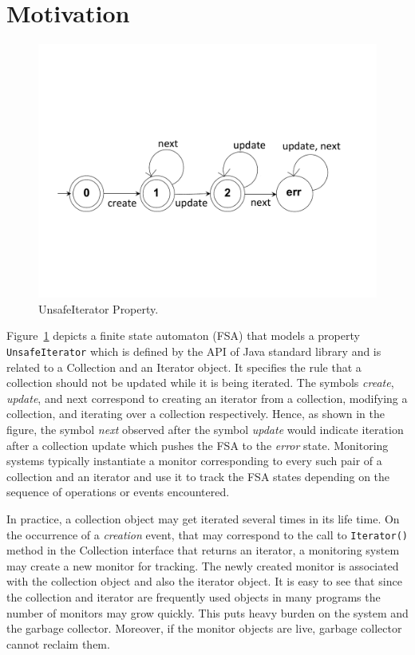 \section{Motivation}
\label{sec:motivation}

\begin{figure}[t]
\centering
  \includegraphics[scale=0.3, trim=0 5cm 0 6cm]{./images/unsafeiterator.pdf}
  \caption[UnsafeIterator Property FSA]{UnsafeIterator Property.}
  \label{fig:unsafeiteratorfsa}
\end{figure}

Figure~\ref{fig:unsafeiteratorfsa} depicts a finite state automaton (FSA) that models a property \texttt{UnsafeIterator} which is defined by the API of Java standard library and is related to a \textsf{Collection} and an \textsf{Iterator} object. It specifies the rule that a collection should not be updated while it is being iterated. The symbols \textit{create}, \textit{update}, and {next} correspond to creating an iterator from a collection, modifying a collection, and iterating over a collection respectively. Hence, as shown in the figure, the symbol \textit{next} observed after the symbol \textit{update} would indicate iteration after a collection update which pushes the FSA to the \textit{error} state. Monitoring systems typically instantiate a monitor corresponding to every such pair of a collection and an iterator and use it to track the FSA states depending on the sequence of operations or events encountered.

In practice, a collection object may get iterated several times in its life time. On the occurrence of a \textit{creation} event, that may correspond to the call to \texttt{Iterator()} method in the \textsf{Collection} interface that returns an iterator, a monitoring system may create a new monitor for tracking. The newly created monitor is associated with the collection object and also the iterator object. It is easy to see that since the collection and iterator are frequently used objects in many programs the number of monitors may grow quickly. This puts heavy burden on the system and the garbage collector. Moreover, if the monitor objects are live, garbage collector cannot reclaim them.


